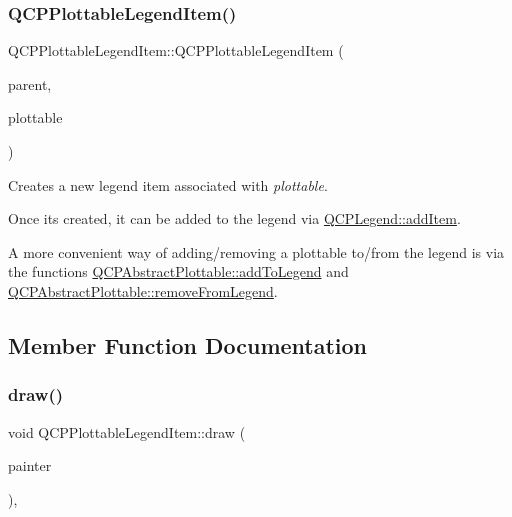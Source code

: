 \subsubsection{\texorpdfstring{QCPPlottableLegendItem()}{QCPPlottableLegendItem()}}
{\footnotesize\ttfamily Q\+C\+P\+Plottable\+Legend\+Item\+::\+Q\+C\+P\+Plottable\+Legend\+Item (\begin{DoxyParamCaption}\item[{\mbox{\hyperlink{class_q_c_p_legend}{Q\+C\+P\+Legend}} $\ast$}]{parent,  }\item[{\mbox{\hyperlink{class_q_c_p_abstract_plottable}{Q\+C\+P\+Abstract\+Plottable}} $\ast$}]{plottable }\end{DoxyParamCaption})}

Creates a new legend item associated with {\itshape plottable}.

Once it\textquotesingle{}s created, it can be added to the legend via \mbox{\hyperlink{class_q_c_p_legend_a3ab274de52d2951faea45a6d975e6b3f}{Q\+C\+P\+Legend\+::add\+Item}}.

A more convenient way of adding/removing a plottable to/from the legend is via the functions \mbox{\hyperlink{class_q_c_p_abstract_plottable_aa64e93cb5b606d8110d2cc0a349bb30f}{Q\+C\+P\+Abstract\+Plottable\+::add\+To\+Legend}} and \mbox{\hyperlink{class_q_c_p_abstract_plottable_a3cc235007e2343a65ad4f463767e0e20}{Q\+C\+P\+Abstract\+Plottable\+::remove\+From\+Legend}}. 

\subsection{Member Function Documentation}
\mbox{\label{class_q_c_p_plottable_legend_item_a5838366619200e99680afa6d355d13fa}} 
\subsubsection{\texorpdfstring{draw()}{draw()}}
{\footnotesize\ttfamily void Q\+C\+P\+Plottable\+Legend\+Item\+::draw (\begin{DoxyParamCaption}\item[{\mbox{\hyperlink{class_q_c_p_painter}{Q\+C\+P\+Painter}} $\ast$}]{painter }\end{DoxyParamCaption})\hspace{0.3cm}{\ttfamily [protected]}, {\ttfamily [virtual]}}



